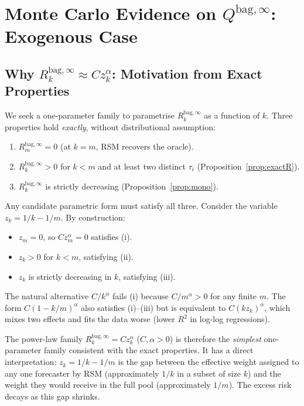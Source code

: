 \documentclass[12pt,a4paper]{article}
\theoremstyle{definition}
\newcommand{\Rk}{R_k^{\mathrm{bag},\infty}}
\begin{document}
\section{Monte Carlo Evidence on $Q^{\mathrm{bag},\infty}$: Exogenous Case}
\label{sec:exomc}

\subsection{Why $\Rk\approx Cz_k^\alpha$: Motivation from Exact Properties}
\label{sec:why_powerlaw}

We seek a one-parameter family to parametrise $\Rk$ as a function of $k$.
Three properties hold \emph{exactly}, without distributional assumption:
\begin{enumerate}[label=(\roman*)]
  \item $R_m^{\mathrm{bag},\infty}=0$ (at $k=m$, RSM recovers the oracle).
  \item $\Rk>0$ for $k<m$ and at least two distinct $\tau_i$ (Proposition~\ref{prop:exactR}).
  \item $\Rk$ is strictly decreasing (Proposition~\ref{prop:mono}).
\end{enumerate}
Any candidate parametric form must satisfy all three.  Consider the variable
$z_k=1/k-1/m$.  By construction:
\begin{itemize}[nosep]
  \item $z_m=0$, so $Cz_m^\alpha=0$ satisfies (i). \checkmark
  \item $z_k>0$ for $k<m$, satisfying (ii). \checkmark
  \item $z_k$ is strictly decreasing in $k$, satisfying (iii). \checkmark
\end{itemize}
The natural alternative $C/k^\alpha$ fails (i) because $C/m^\alpha>0$
for any finite $m$.  The form $C(1-k/m)^\alpha$ also satisfies (i)--(iii)
but is equivalent to $C(kz_k)^\alpha$, which mixes two effects and fits
the data worse (lower $R^2$ in log-log regressions).

The power-law family $\Rk=Cz_k^\alpha$ ($C,\alpha>0$) is therefore the
\emph{simplest} one-parameter family consistent with the exact properties.
It has a direct interpretation: $z_k=1/k-1/m$ is the gap between the
effective weight assigned to any one forecaster by RSM (approximately $1/k$
in a subset of size $k$) and the weight they would receive in the full pool
(approximately $1/m$).  The excess risk decays as this gap shrinks.
\end{document}
